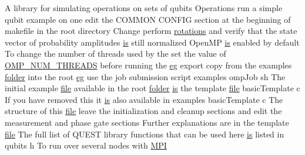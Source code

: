 \begin{DoxyCompactItemize}
A library for simulating operations on sets of qubits Operations run a simple qubit example on one edit the COMMON CONFIG section at the beginning of makefile in the root directory Change perform \hyperlink{README_8md_a168d0f076329da35a2b080049c35cecd}{rotations} and verify that the state vector of probability amplitudes \hyperlink{README_8md_ac361bc388656077907485b42e1531a85}{is} still normalized OpenMP \hyperlink{README_8md_ac361bc388656077907485b42e1531a85}{is} enabled by default To change the number of threads used by the set the value of \hyperlink{README_8md_ac0f875e6c5b5526a6781e0fbba81e6a4}{OMP\_\-NUM\_\-THREADS} before running the \hyperlink{README_8md_a60a90a09308ad7ec0ea2ac389281518b}{eg} export copy from the examples \hyperlink{README_8md_ac5527449269e33be598e819921cd9e43}{folder} into the root \hyperlink{README_8md_a60a90a09308ad7ec0ea2ac389281518b}{eg} use the job submission script examples ompJob sh The initial example \hyperlink{README_8md_a5078360f0afc4e756290c3197d1abfe9}{file} available in the root \hyperlink{README_8md_ac5527449269e33be598e819921cd9e43}{folder} \hyperlink{README_8md_ac361bc388656077907485b42e1531a85}{is} the template \hyperlink{README_8md_a5078360f0afc4e756290c3197d1abfe9}{file} basicTemplate c If you have removed this it \hyperlink{README_8md_ac361bc388656077907485b42e1531a85}{is} also available in examples basicTemplate c The structure of this \hyperlink{README_8md_a5078360f0afc4e756290c3197d1abfe9}{file} leave the initialization and cleanup sections and edit the measurement and phase gate sections Further explanations are in the template \hyperlink{README_8md_a5078360f0afc4e756290c3197d1abfe9}{file} The full list of QUEST library functions that can be used here \hyperlink{README_8md_ac361bc388656077907485b42e1531a85}{is} listed in qubits h To run over several nodes with \hyperlink{README_8md_ac2feaefc780a902d0d04f9a7d5a25813}{MPI}
\item 

\end{DoxyCompactItemize}
